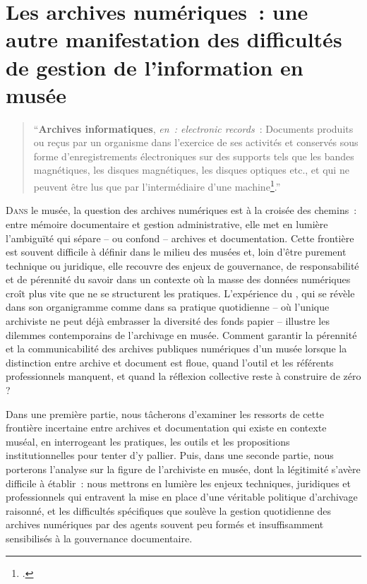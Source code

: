 \chapter[Les archives numériques]{\label{II-C}Les archives numériques~: une autre manifestation des difficultés de gestion de l’information en musée }

\begin{quote}
	\enquote{\textbf{Archives informatiques}, \textit{en~: electronic records}~:
		Documents produits ou reçus par un organisme dans l'exercice de
		ses activités et conservés sous forme d'enregistrements
		électroniques sur des supports tels que les bandes magnétiques,
		les disques magnétiques, les disques optiques etc., et qui ne
		peuvent être lus que par l’intermédiaire d’une machine\footcite{directiondesarchivesdefranceDictionnaireTerminologieArchivistique2002}.}
\end{quote}

\lettrine{D}{ans} le musée, la question des archives numériques est à la croisée des chemins~: entre mémoire documentaire et gestion administrative, elle met en lumière l’ambiguïté qui sépare – ou confond – archives et documentation. Cette frontière est souvent difficile à définir dans le milieu des musées et, loin d’être purement technique ou juridique, elle recouvre des enjeux de gouvernance, de responsabilité et de pérennité du savoir dans un contexte où la masse des données numériques croît plus vite que ne se structurent les pratiques. L’expérience du \mae, qui se révèle dans son organigramme comme dans sa pratique quotidienne – où l’unique archiviste ne peut déjà embrasser la diversité des fonds papier – illustre les dilemmes contemporains de l’archivage en musée. Comment garantir la pérennité et la communicabilité des archives publiques numériques d'un musée lorsque la distinction entre archive et document est floue, quand l’outil et les référents professionnels manquent, et quand la réflexion collective reste à construire de zéro ? 

Dans une première partie, nous tâcherons d'examiner les ressorts de cette frontière incertaine entre archives et documentation qui existe en contexte muséal, en interrogeant les pratiques, les outils et les propositions institutionnelles pour tenter d'y pallier. Puis, dans une seconde partie, nous porterons l’analyse sur la figure de l’archiviste en musée, dont la légitimité s’avère difficile à établir~: nous mettrons en lumière les enjeux techniques, juridiques et professionnels qui entravent la mise en place d’une véritable politique d’archivage raisonné, et les difficultés spécifiques que soulève la gestion quotidienne des archives numériques par des agents souvent peu formés et insuffisamment sensibilisés à la gouvernance documentaire.

